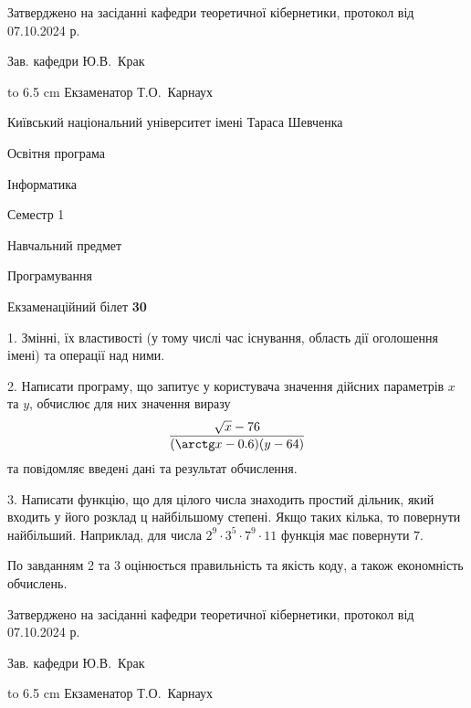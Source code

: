 \documentclass[12pt, ukrainian]{article}
\begin{document}
{\smallskip\smallskip \begin {scriptsize} Затверджено на засіданні кафедри теоретичної кібернетики, протокол   від   07.10.2024 р.\par\smallskip\smallskip\smallskip\smallskip
{\parbox {6.5 cm} {Зав. кафедри \dotfill Ю.В.~Крак}}\hspace {0.7cm} {\hbox to 6.5 cm { Екзаменатор \dotfill Т.О.~Карнаух}} \end{scriptsize}}
\vspace{0.9cm}
{{\begin {scriptsize}\par
{ \center  Київський національний університет імені Тараса Шевченка \par}
{\parbox {5 cm}{Освітня програма \hfill}{\parbox {7 cm}{Інформатика\hfill}}\parbox {6 cm}{\hfill Семестр 1}}\par
{\parbox {5 cm} {Навчальний предмет \hfill}\parbox {7 cm}{Програмування \hfill}\parbox {6cm}{\hfill}\par}\vspace{-15pt} \end{scriptsize}}{\center Екзаменаційний білет \No \textbf { 30 }\par}}
{%
1. Змінні, їх властивості (у тому числі час існування, область дії оголошення імені) та операції над ними.%
\par
2. Написати програму, що запитує у користувача значення дійсних параметрів $x$ та $y$, обчислює для них значення виразу 
$$\frac{\sqrt x - 76}{(\arctg x - 0.6) (y - 64)}$$ 
та повiдомляє введенi данi та результат обчислення.

\par
3. Написати функцію, що для цілого числа знаходить простий дільник, який входить у його розклад ц найбільшому степені. Якщо таких кілька, то повернути найбільший. Наприклад, для числа $2^{9}{\cdot}3^5{\cdot}7^9{\cdot}11$ функція має повернути $7$.

По завданням 2 та 3 оцінюється правильність та якість коду, а також економність обчислень.

}
{\smallskip\smallskip \begin {scriptsize} Затверджено на засіданні кафедри теоретичної кібернетики, протокол   від   07.10.2024 р.\par\smallskip\smallskip\smallskip\smallskip
{\parbox {6.5 cm} {Зав. кафедри \dotfill Ю.В.~Крак}}\hspace {0.7cm} {\hbox to 6.5 cm { Екзаменатор \dotfill Т.О.~Карнаух}} \end{scriptsize}}
\end{document}
